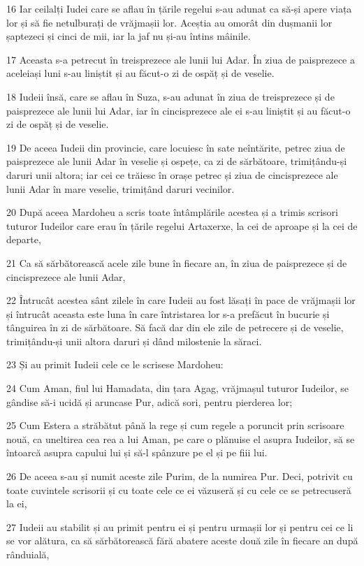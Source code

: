 \par 16 Iar ceilalți Iudei care se aflau în țările regelui s-au adunat ca să-și apere viața lor și să fie netulburați de vrăjmașii lor. Aceștia au omorât din dușmanii lor șaptezeci și cinci de mii, iar la jaf nu și-au întins mâinile.
\par 17 Aceasta s-a petrecut în treisprezece ale lunii lui Adar. În ziua de paisprezece a aceleiași luni s-au liniștit și au făcut-o zi de ospăț și de veselie.
\par 18 Iudeii însă, care se aflau în Suza, s-au adunat în ziua de treisprezece și de paisprezece ale lunii lui Adar, iar în cincisprezece ale ei s-au liniștit și au făcut-o zi de ospăț și de veselie.
\par 19 De aceea Iudeii din provincie, care locuiesc în sate neîntărite, petrec ziua de paisprezece ale lunii Adar în veselie și ospețe, ca zi de sărbătoare, trimițându-și daruri unii altora; iar cei ce trăiesc în orașe petrec și ziua de cincisprezece ale lunii Adar în mare veselie, trimițând daruri vecinilor.
\par 20 După aceea Mardoheu a scris toate întâmplările acestea și a trimis scrisori tuturor Iudeilor care erau în țările regelui Artaxerxe, la cei de aproape și la cei de departe,
\par 21 Ca să sărbătorească acele zile bune în fiecare an, în ziua de paisprezece și de cincisprezece ale lunii Adar,
\par 22 Întrucât acestea sânt zilele în care Iudeii au fost lăsați în pace de vrăjmașii lor și întrucât aceasta este luna în care întristarea lor s-a prefăcut în bucurie și tânguirea în zi de sărbătoare. Să facă dar din ele zile de petrecere și de veselie, trimițându-și unii altora daruri și dând milostenie la săraci.
\par 23 Și au primit Iudeii cele ce le scrisese Mardoheu:
\par 24 Cum Aman, fiul lui Hamadata, din țara Agag, vrăjmașul tuturor Iudeilor, se gândise să-i ucidă și aruncase Pur, adică sori, pentru pierderea lor;
\par 25 Cum Estera a străbătut până la rege și cum regele a poruncit prin scrisoare nouă, ca uneltirea cea rea a lui Aman, pe care o plănuise el asupra Iudeilor, să se întoarcă asupra capului lui și să-l spânzure pe el și pe fiii lui.
\par 26 De aceea s-au și numit aceste zile Purim, de la numirea Pur. Deci, potrivit cu toate cuvintele scrisorii și cu toate cele ce ei văzuseră și cu cele ce se petrecuseră la ei,
\par 27 Iudeii au stabilit și au primit pentru ei și pentru urmașii lor și pentru cei ce li se vor alătura, ca să sărbătorească fără abatere aceste două zile în fiecare an după rânduială,
